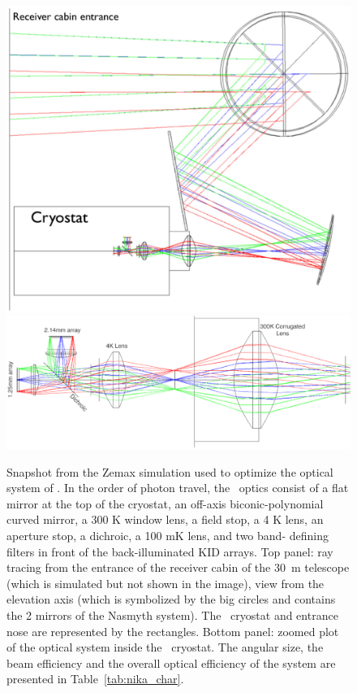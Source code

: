 \begin{figure}[t!]
\begin{center}
\includegraphics[scale=0.25]{figures/optics_11.eps}
\includegraphics[scale=0.25]{figures/optics_2.eps}
\end{center}
\caption{Snapshot from the Zemax simulation used to optimize the optical
  system of \NIKA. In the order of photon travel, the \NIKA\ optics consist of a flat mirror at the top of the cryostat, an off-axis biconic-polynomial curved mirror, a 300 K window lens, a field stop, a 4 K lens, an aperture stop, a dichroic, a 100 mK lens, and two band- defining filters in front of the back-illuminated KID arrays. Top panel: ray tracing from the entrance of the
  receiver cabin of the 30~m telescope (which is simulated but not shown in the
  image), view from the elevation axis (which is symbolized by the big circles
  and contains the 2 mirrors of the Nasmyth system). The \NIKA\ cryostat and
  entrance nose are represented by the rectangles. Bottom panel: zoomed plot of the optical system inside the \NIKA\ cryostat. The angular size, the beam efficiency and the overall optical efficiency of the system are presented in Table~\ref{tab:nika_char}.}
\label{fig:optics}
   \end{figure}

